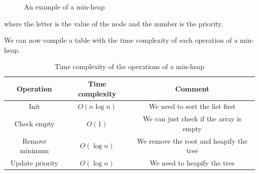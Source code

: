 \documentclass[12pt]{extarticle}
\begin{document}
\begin{figure}[H]
    \centering

    \caption{An example of a min-heap} \label{fig:minheap}
\end{figure}

where the letter is the value of the node and the number is the priority.

We can now compile a table with the time complexity of each operation of a min-heap.

\begin{table}[H]
    \centering
    \begin{tabular}{ |c|c|c| }
        \hline
        \textbf{Operation} & \textbf{Time complexity} & \textbf{Comment}                        \\
        \hline
        Init               & $O(n \log n)$            & We need to sort the list first          \\
        Check empty        & $O(1)$                   & We can just check if the array is empty \\
        Remove minimum     & $O(\log n)$              & We remove the root and heapify the tree \\
        Update priority    & $O(\log n)$              & We need to heapify the tree             \\
        \hline
    \end{tabular}
    \caption{Time complexity of the operations of a min-heap}
    \label{tab:minheap}
\end{table}
\end{document}
